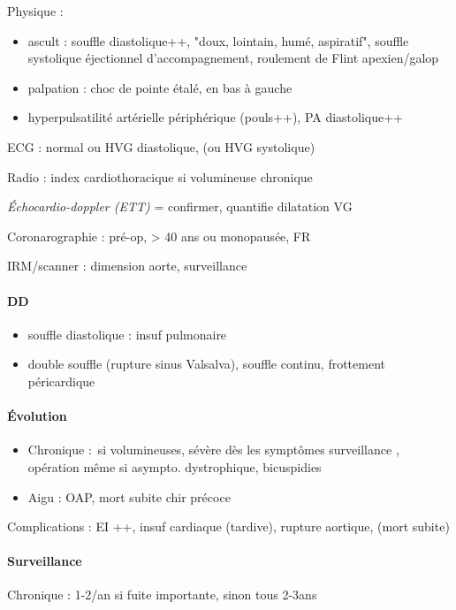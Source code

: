 \documentclass{article}
\begin{document}
Physique : 
\begin{itemize}
  \item ascult : souffle diastolique++, "doux, lointain, humé, aspiratif",
    souffle systolique éjectionnel d'accompagnement, roulement de Flint
    apexien/galop
  \item palpation : choc de pointe étalé, en bas à gauche
  \item hyperpulsatilité artérielle périphérique (pouls++), \dec PA
    diastolique++
\end{itemize}

ECG : normal ou \gls{HVG} diastolique, (ou HVG systolique)

Radio : \inc index cardiothoracique si volumineuse chronique

\textit{Échocardio-doppler (ETT)} = confirmer, quantifie dilatation VG 

Coronarographie : pré-op, \male > 40 ans ou \female monopausée, FR

IRM/scanner : dimension aorte, surveillance

\paragraph{DD} 
\begin{itemize}
  \item souffle diastolique : insuf pulmonaire
  \item double souffle (rupture sinus Valsalva), souffle continu, frottement
    péricardique
\end{itemize}
\paragraph{Évolution}
\begin{itemize}
  \item Chronique : si volumineuses, sévère dès les symptômes \thus surveillance
\danger, opération même si asympto. \danger dystrophique, bicuspidies
  \item Aigu : OAP, mort subite \thus chir précoce
\end{itemize}

Complications : EI ++, insuf cardiaque (tardive), rupture aortique, (mort subite)
   
\paragraph{Surveillance} 
Chronique : 1-2/an si fuite importante, sinon tous 2-3ans
\end{document}
